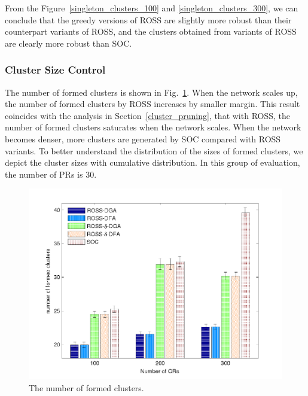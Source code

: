 \documentclass[10pt,journal,compsoc]{IEEEtran}
\theoremstyle{mytheoremstyle}
\theoremstyle{mytheoremstyle}
\theoremstyle{mytheoremstyle}
\begin{document}
From the Figure~\ref{singleton_clusters_100} and \ref{singleton_clusters_300}, we can conclude that the greedy versions of ROSS are slightly more robust than their counterpart variants of ROSS, and the clusters obtained from variants of ROSS are clearly more robust than SOC. 


\subsubsection{Cluster Size Control}

The number of formed clusters is shown in Fig.~\ref{nClusters_largeNetwork}.
When the network scales up, the number of formed clusters by ROSS increases by smaller margin.
This result coincides with the analysis in Section~\ref{cluster_pruning}, that with ROSS, the number of formed clusters saturates when the network scales.
When the network becomes denser, more clusters are generated by SOC compared with ROSS variants.
To better understand the distribution of the sizes of formed clusters, we depict the cluster sizes with cumulative distribution.
In this group of evaluation, the number of PRs is 30.

\begin{figure}[!h]
  \centering
   \includegraphics[width=1\linewidth]{nClusters_largeNetwork.pdf}
  \caption{The number of formed clusters.}
  \label{nClusters_largeNetwork}
\end{figure}
\end{document}
